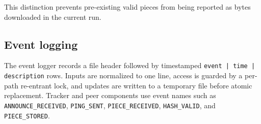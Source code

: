 This distinction prevents pre-existing valid pieces from being reported as bytes downloaded in the current run.

\subsection{Event logging}

The event logger records a file header followed by timestamped \texttt{event | time | description} rows. Inputs are normalized to one line, access is guarded by a per-path re-entrant lock, and updates are written to a temporary file before atomic replacement. Tracker and peer components use event names such as \texttt{ANNOUNCE\_RECEIVED}, \texttt{PING\_SENT}, \texttt{PIECE\_RECEIVED}, \texttt{HASH\_VALID}, and \texttt{PIECE\_STORED}.
